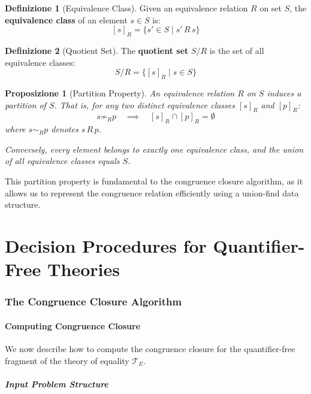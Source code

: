 \documentclass[11pt,a4paper]{article}
\theoremstyle{definition}
\newtheorem{definition}{Definizione}[section]
\theoremstyle{plain}
\newtheorem{proposition}[theorem]{Proposizione}
\theoremstyle{remark}
\begin{document}
\begin{definition}[Equivalence Class]
Given an equivalence relation $R$ on set $S$, the \textbf{equivalence class} of an element $s \in S$ is:
\[
[s]_R = \{s' \in S \mid s' \, R \, s\}
\]
\end{definition}

\begin{definition}[Quotient Set]
The \textbf{quotient set} $S/R$ is the set of all equivalence classes:
\[
S/R = \{[s]_R \mid s \in S\}
\]
\end{definition}

\begin{proposition}[Partition Property]
An equivalence relation $R$ on $S$ induces a partition of $S$. That is, for any two distinct equivalence classes $[s]_R$ and $[p]_R$:
\[
s \not\sim_R p \quad \implies \quad [s]_R \cap [p]_R = \emptyset
\]
where $s \sim_R p$ denotes $s \, R \, p$.

Conversely, every element belongs to exactly one equivalence class, and the union of all equivalence classes equals $S$.
\end{proposition}

This partition property is fundamental to the congruence closure algorithm, as it allows us to represent the congruence relation efficiently using a union-find data structure.

\newpage

\part{Decision Procedures for Quantifier-Free Theories}

\section{The Congruence Closure Algorithm}

\subsection{Computing Congruence Closure}

We now describe how to compute the congruence closure for the quantifier-free fragment of the theory of equality $\mathcal{T}_E$.

\subsubsection{Input Problem Structure}
\end{document}
